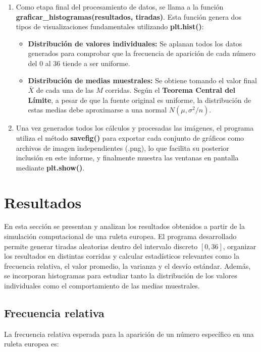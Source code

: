 \documentclass{article}
\begin{document}
\begin{enumerate}
    \item Como etapa final del procesamiento de datos, se llama a la función \textbf{graficar\_histogramas(resultados, tiradas)}. Esta función genera dos tipos de visualizaciones fundamentales utilizando \textbf{plt.hist()}:\begin{itemize}
    \item \textbf{Distribución de valores individuales:} Se aplanan todos los datos generados para comprobar que la frecuencia de aparición de cada número del 0 al 36 tiende a ser uniforme.
    \item \textbf{Distribución de medias muestrales:} Se obtiene tomando el valor final $\bar{X}$ de cada una de las $M$ corridas. Según el \textbf{Teorema Central del Límite}, a pesar de que la fuente original es uniforme, la distribución de estas medias debe aproximarse a una normal $N(\mu, \sigma^2/n)$.\end{itemize}
    \item Una vez generados todos los cálculos y procesadas las imágenes, el programa utiliza el método \textbf{savefig()} para exportar cada conjunto de gráficos como archivos de imagen independientes (.png), lo que facilita su posterior inclusión en este informe, y finalmente muestra las ventanas en pantalla mediante \textbf{plt.show()}.
    
\end{enumerate}

\newpage

\section{Resultados}

En esta sección se presentan y analizan los resultados obtenidos a partir de la simulación computacional de una ruleta europea. El programa desarrollado permite generar tiradas aleatorias dentro del intervalo discreto $[0,36]$, organizar los resultados en distintas corridas y calcular estadísticos relevantes como la frecuencia relativa, el valor promedio, la varianza y el desvío estándar. Además, se incorporan histogramas para estudiar tanto la distribución de los valores individuales como el comportamiento de las medias muestrales.

\subsection{Frecuencia relativa}

La frecuencia relativa esperada para la aparición de un número específico en una ruleta europea es:
\end{document}

